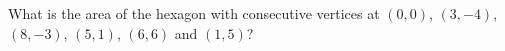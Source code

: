 What is the area of the hexagon with consecutive vertices at $(0,0)$, $(3,-4)$, $(8,-3)$, $(5,1)$, $(6,6)$ and $(1,5)$?
